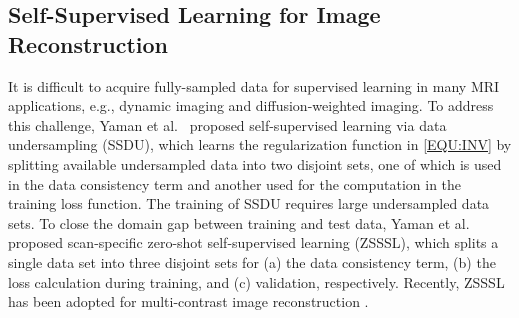 \documentclass[journal,twoside,web]{ieeecolor}
\begin{document}


    \subsection{Self-Supervised Learning for Image Reconstruction}

    It is difficult to acquire fully-sampled data
    for supervised learning in many MRI applications,
    e.g., dynamic imaging and diffusion-weighted imaging.
    To address this challenge, Yaman et al.~\cite{yaman_2020_ssdu}
    proposed self-supervised learning via data undersampling (SSDU),
    which learns the regularization function in \cref{EQU:INV}
    by splitting available undersampled data into two disjoint sets,
    one of which is used in the data consistency term and
    another used for the computation in the training loss function.
    The training of SSDU requires large undersampled data sets.
    To close the domain gap between training and test data,
    Yaman et al.~\cite{yaman_2022_zs} proposed
    scan-specific zero-shot self-supervised learning (ZSSSL),
    which splits a single data set into three disjoint sets
    for (a) the data consistency term, (b) the loss calculation during training,
    and (c) validation, respectively.
    Recently, ZSSSL has been adopted for multi-contrast image reconstruction
    \cite{heydari_2024_jmaple}.
\end{document}
